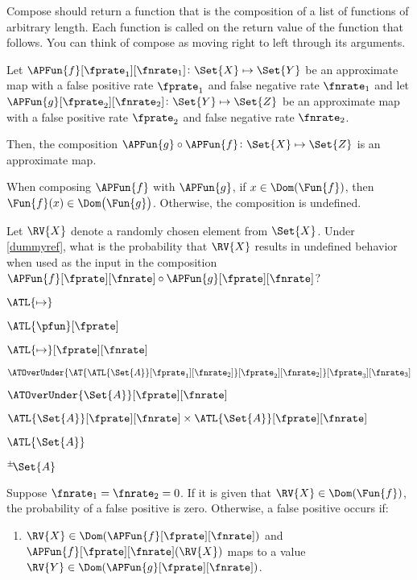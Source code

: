 \documentclass[ ../main.tex]{subfiles}
\begin{document}
Compose should return a function that is the composition of a list of functions of arbitrary length. Each function is called on the return value of the function that follows. You can think of compose as moving right to left through its arguments.

Let $\APFun{f}[\fprate_1][\fnrate_1] \colon \Set{X} \mapsto \Set{Y}$ be an approximate map with a false positive rate $\fprate_1$ and false negative rate $\fnrate_1$ and let $\APFun{g}[\fprate_2][\fnrate_2] \colon \Set{Y} \mapsto \Set{Z}$ be an approximate map with a false positive rate $\fprate_2$ and false negative rate $\fnrate_2$.

Then, the composition $\APFun{g} \circ \APFun{f} \colon \Set{X} \mapsto \Set{Z}$ is an approximate map.

\begin{assumption}
When composing $\APFun{f}$ with $\APFun{g}$, if $x \in \Dom(\Fun{f})$, then $\Fun{f}(x) \in \Dom\!\left(\Fun{g}\right)$. Otherwise, the composition is undefined.
\end{assumption}
Let $\RV{X}$ denote a randomly chosen element from $\Set{X}$. Under \cref{dummyref}, what is the probability that $\RV{X}$ results in undefined behavior when used as the input in the composition $\APFun{f}[\fprate][\fnrate] \circ \APFun{g}[\fprate][\fnrate]$?


$\ATL{\mapsto}$

$\ATL{\pfun}[\fprate]$

$\ATL{\mapsto}[\fprate][\fnrate]$


$\ATOverUnder{\AT{\ATL{\Set{A}}[\fprate_1][\fnrate_2]}[\fprate_2][\fnrate_2]}[\fprate_3][\fnrate_3]$

$\ATOverUnder{\Set{A}}[\fprate][\fnrate]$


$\ATL{\Set{A}}[\fprate][\fnrate] \times \ATL{\Set{A}}[\fprate][\fnrate]$


$\ATL{\Set{A}}$

${}^{\pm} \! \Set{A}$



Suppose $\fnrate_1 = \fnrate_2 = 0$. If it is given that $\RV{X} \in \Dom(\Fun{f})$, the probability of a false positive is zero. Otherwise, a false positive occurs if:
\begin{enumerate}
    \item $\RV{X} \in \Dom(\APFun{f}[\fprate][\fnrate])$ and $\APFun{f}[\fprate][\fnrate](\RV{X})$ maps to a value $\RV{Y} \in \Dom(\APFun{g}[\fprate][\fnrate])$.
\end{enumerate}
\end{document}
